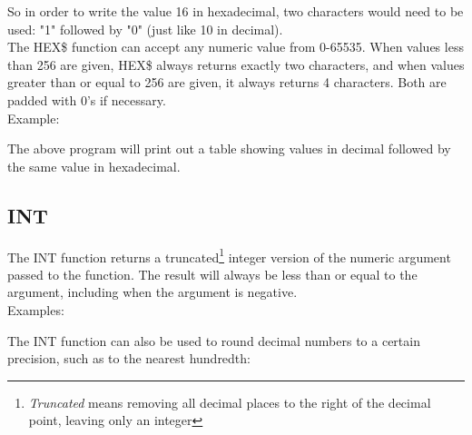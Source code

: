 \vspace{16pt}

So in order to write the value 16 in hexadecimal, two characters would need to
be used: "1" followed by "0" (just like 10 in decimal).\\

The {\ttfamily HEX\$} function can accept any numeric value from 0-65535.  When
values less than 256 are given, {\ttfamily HEX\$} always returns exactly two
characters, and when values greater than or equal to 256 are given, it always
returns 4 characters.  Both are padded with 0's if necessary.\\

Example:\\


The above program will print out a table showing values in decimal followed by
the same value in hexadecimal.\\

\subsection{INT}

The {\ttfamily INT} function returns a truncated\footnote{{\em Truncated} means
removing all decimal places to the right of the decimal point, leaving only an
integer} integer version of the numeric argument passed to the function.  The
result will always be less than or equal to the argument, including when the
argument is negative.\\

Examples:\\


The {\ttfamily INT} function can also be used to round decimal numbers to a
certain precision, such as to the nearest hundredth:\\


